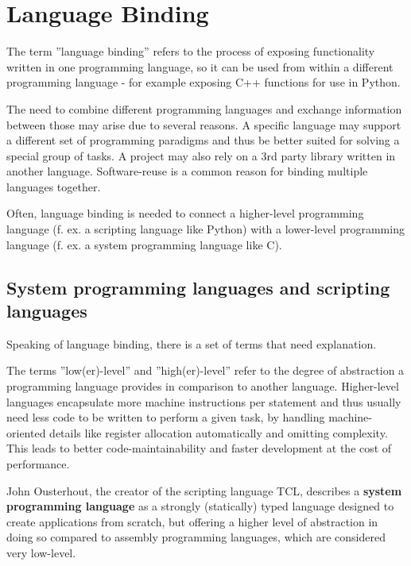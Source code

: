 \chapter{Language Binding}

The term ''language binding'' refers to the process of exposing functionality written in one programming language, so it can be used from within a different programming language - for example exposing C++ functions for use in Python.

The need to combine different programming languages and exchange information between those may arise due to several reasons. A specific language may support a different set of programming paradigms and thus be better suited for solving a special group of tasks. A project may also rely on a 3rd party library written in another language. Software-reuse is a common reason for binding multiple languages together.

Often, language binding is needed to connect a higher-level programming language (f. ex. a scripting language like Python) with a lower-level programming language (f. ex. a system programming language like C).

\section{System programming languages and scripting languages}

Speaking of language binding, there is a set of terms that need explanation.

The terms ''low(er)-level'' and ''high(er)-level'' refer to the degree of abstraction a programming language provides in comparison to another language. Higher-level languages encapsulate more machine instructions per statement and thus usually need less code to be written to perform a given task, by handling machine-oriented details like register allocation automatically and omitting complexity. This leads to better code-maintainability and faster development at the cost of performance. 

John Ousterhout, the creator of the scripting language TCL, describes a \textbf{system programming language} as a strongly (statically) typed language designed to create applications from scratch, but offering a higher level of abstraction in doing so compared to assembly programming languages, which are considered very low-level.

